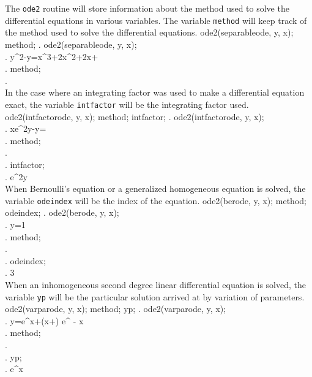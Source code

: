 The \texttt{ode2} routine will store information about the method used
to solve the differential equations in various variables.
The variable \texttt{method} will keep track of the method used to
solve the differential equations.
\beginmaximasession
ode2(separableode, y, x);
method;
\maximatexsession
{}.  ode2(separableode, y, x); \\
.   y^{2}-y=x^{3}+2\*x^{2}+2\*x+ \\
.  method; \\
.    \\
\endmaximasession
\noindent
In the case where an integrating factor was used to make a
differential equation exact, the variable \texttt{intfactor} will be
the integrating factor used.
\beginmaximasession
ode2(intfactorode, y, x);
method;
intfactor;
\maximatexsession
{}.  ode2(intfactorode, y, x); \\
.   x\*e^{2\*y}-\log y= \\
.  method; \\
.    \\
.  intfactor; \\
.   {{e^{2\*y}}} \\
\endmaximasession
\noindent
When Bernoulli's equation or a generalized homogeneous equation is
solved, the variable \texttt{odeindex} will be the index of the
equation.
\beginmaximasession
ode2(berode, y, x);
method;
odeindex;
\maximatexsession
{}.  ode2(berode, y, x); \\
.   y={{1}} \\
.  method; \\
.    \\
.  odeindex; \\
.   3 \\
\endmaximasession
\noindent
When an inhomogeneous second degree linear differential equation is
solved, the variable \texttt{yp} will be the particular solution
arrived at by variation of parameters.
\beginmaximasession
ode2(varparode, y, x);
method;
yp;
\maximatexsession
{}.  ode2(varparode, y, x); \\
.   y={{e^{x}}}+\left(\*x+\right)
 \*e^ {- x } \\
.  method; \\
.    \\
.  yp; \\
.   {{e^{x}}} \\
\endmaximasession



